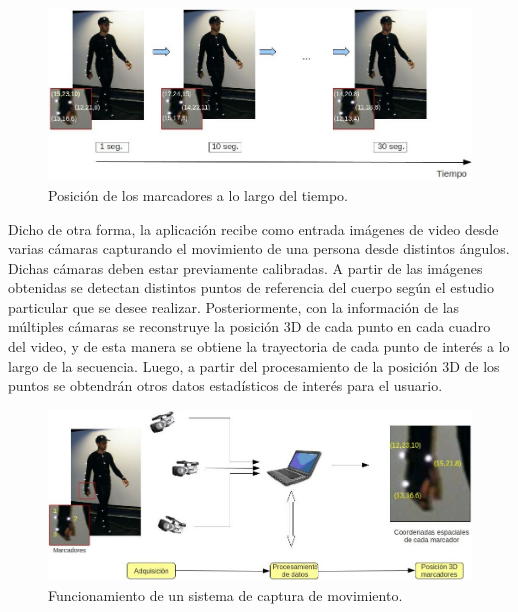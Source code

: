 \begin{figure}[H]
\begin{center}
\includegraphics[scale=0.4]{img/Sistema_completo/diagrama_abuelas_2.jpg}
\end{center}
\caption{Posición de los marcadores a lo largo del tiempo.}
\label{abuela2}
\end{figure}

Dicho de otra forma, la aplicación recibe como entrada imágenes de video desde varias cámaras capturando el movimiento de una persona desde distintos ángulos. Dichas cámaras deben estar previamente calibradas. A partir de las imágenes obtenidas se detectan distintos puntos de referencia del cuerpo según el estudio particular que se desee realizar. Posteriormente, con la información de las múltiples cámaras se reconstruye la posición 3D de cada punto en cada cuadro del video, y de esta manera se obtiene la trayectoria de cada punto de interés a lo largo de la secuencia. Luego, a partir del procesamiento de la posición 3D de los puntos se obtendrán otros datos estadísticos de interés para el usuario.

\begin{figure}[H]
\begin{center}
\includegraphics[scale=0.4]{img/Sistema_completo/diagrama_abuelas_1.jpg}
\end{center}
\caption{Funcionamiento de un sistema de captura de movimiento.}
\label{abuela1}
\end{figure}

